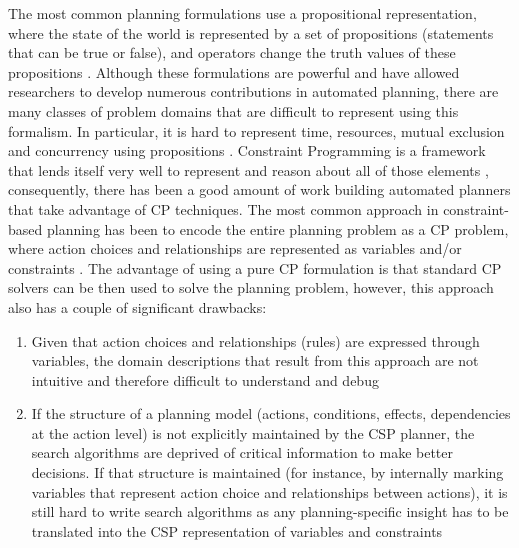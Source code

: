 The most common planning formulations use a propositional
representation, where the state of the world is represented by a set
of propositions (statements that can be true or false), and operators
change the truth values of these propositions \cite{gen87}. Although
these formulations are powerful and have allowed researchers to
develop numerous contributions in automated planning, there are many
classes of problem domains that are difficult to represent using this
formalism. In particular, it is hard to represent time, resources,
mutual exclusion and concurrency using propositions \cite{ghallab04}.
Constraint Programming is a framework that lends itself very well to
represent and reason about all of those elements \cite{ghallab94},
consequently, there has been a good amount of work building automated
planners that take advantage of CP techniques.  The most common
approach in constraint-based planning has been to encode the entire
planning problem as a CP problem, where action choices and
relationships are represented as variables and/or constraints
\cite{do01,vanbeek99,vossen99,wolfman99}.  The advantage of using a
pure CP formulation is that standard CP solvers can be then used to
solve the planning problem, however, this approach also has a couple
of significant drawbacks:

\begin{enumerate} 

\item Given that action choices and relationships (rules) are expressed
  through variables, the domain descriptions that result from this
  approach are not intuitive and therefore difficult to understand and
  debug

\item If the structure of a planning model (actions, conditions,
  effects, dependencies at the action level) is not explicitly
  maintained by the CSP planner, the search algorithms are deprived of
  critical information to make better decisions. If that structure is
  maintained (for instance, by internally marking variables that
  represent action choice and relationships between actions), it is
  still hard to write search algorithms as any planning-specific
  insight has to be translated into the CSP representation of
  variables and constraints 

\end{enumerate}

